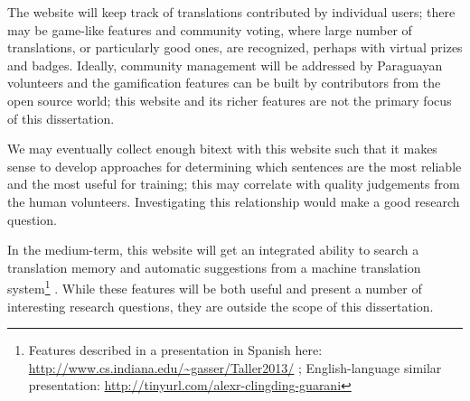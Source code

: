 The website will keep track of translations contributed by individual users;
there may be game-like features and community voting, where large number of
translations, or particularly good ones, are recognized, perhaps with virtual
prizes and badges.
Ideally, community management will be addressed by Paraguayan volunteers and
the gamification features can be built by contributors from the open source
world; this website and its richer features are not the primary focus of this
dissertation.

We may eventually collect enough bitext with this website such that it makes
sense to develop approaches for determining which sentences are the most
reliable and the most useful for training; this may correlate with quality
judgements from the human volunteers.
Investigating this relationship would make a good research question.

In the medium-term, this website will get an integrated ability to search
a translation memory and automatic suggestions from a machine translation
system\footnote{Features described in a presentation in Spanish here:
\url{http://www.cs.indiana.edu/~gasser/Taller2013/} ; English-language similar
presentation: \url{http://tinyurl.com/alexr-clingding-guarani} }
. While these features will be both useful and present a number of
interesting research questions, they are outside the scope of this
dissertation.
